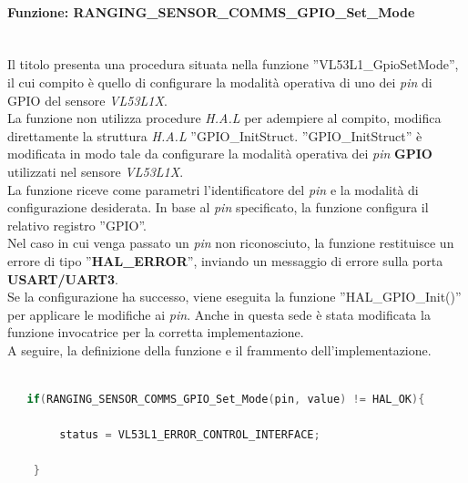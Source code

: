 \paragraph{Funzione: RANGING\_SENSOR\_COMMS\_GPIO\_Set\_Mode}\mbox{}\\
Il titolo presenta una procedura situata nella funzione ''VL53L1\_GpioSetMode'', il cui compito è quello di configurare la modalità operativa di uno dei \textit{pin} di GPIO del sensore \textit{VL53L1X}.\\
La funzione non utilizza procedure \textit{H.A.L} per adempiere al compito, modifica direttamente la struttura \textit{H.A.L} ''GPIO\_InitStruct. ''GPIO\_InitStruct'' è modificata in modo tale da configurare la modalità operativa
dei \textit{pin} \textbf{GPIO} utilizzati nel sensore \textit{VL53L1X}.\\
La funzione riceve come parametri l'identificatore del \textit{pin} e la modalità di configurazione desiderata. In base al \textit{pin} specificato, la funzione configura il relativo registro ''GPIO''.\\
Nel caso in cui venga passato un \textit{pin} non riconosciuto, la funzione restituisce un errore di tipo ''\textbf{HAL\_ERROR}'', inviando un messaggio di errore sulla porta \textbf{USART/UART3}.\\
Se la configurazione ha successo, viene eseguita la funzione ''HAL\_GPIO\_Init()'' per applicare le modifiche ai \textit{pin}. Anche in questa sede è stata modificata la funzione invocatrice per la corretta implementazione.\\
A seguire, la definizione della funzione e il frammento dell'implementazione.\\

\begin{lstlisting}[language=Cpp, caption={\footnotesize Dettaglio sull'implementazione di \textit{RANGING\_SENSOR\_COMMS\_GPIO\_Set\_Value} in \textit{VL53L1\_GpioSetMode}}]
    
   if(RANGING_SENSOR_COMMS_GPIO_Set_Mode(pin, value) != HAL_OK){
        
        status = VL53L1_ERROR_CONTROL_INTERFACE;

    }

\end{lstlisting}


